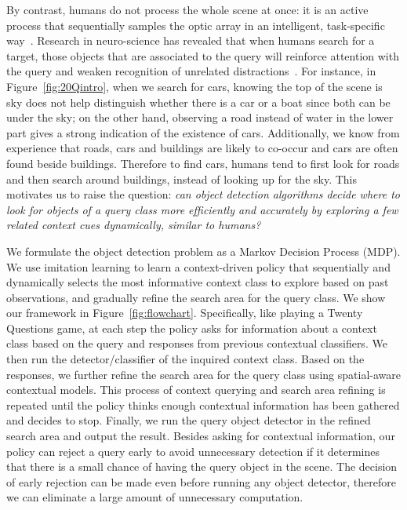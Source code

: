 By contrast, humans do not process the whole scene at once: it is an active process that sequentially samples the optic array in an intelligent, task-specific way~\cite{najemnik2005optimal}. Research in neuro-science has revealed that when humans search for a target, those objects that are associated to the query will reinforce attention with the query and weaken recognition of unrelated distractions~\cite{moores2003associative}. 
For instance, in Figure~\ref{fig:20Qintro}, when we search for cars, knowing the top of the scene is sky does not help distinguish whether there is a car or a boat since both can be under the sky; 
on the other hand, observing a road instead of water in the lower part gives a strong indication of the existence of cars. 
Additionally, we know from experience that roads, cars and buildings are likely to co-occur and cars are often found beside buildings. 
Therefore to find cars, humans tend to first look for roads and then search around buildings, instead of looking up for the sky. %
This motivates us to raise the question: \textit{can object detection algorithms decide where to look for objects of a query class more efficiently and accurately by exploring a few related context cues dynamically, similar to humans?}

We formulate the object detection problem as a Markov Decision Process (MDP). 
We use imitation learning to learn a context-driven policy that sequentially and dynamically selects the most informative context class to explore based on past observations, and gradually refine the search area for the query class. 
We show our framework in Figure~\ref{fig:flowchart}.  Specifically, like playing a Twenty Questions game, at each step the policy asks for information about a context class based on the query and responses from previous contextual classifiers. 
We then run the detector/classifier of the inquired context class. Based on the responses, we further refine the search area for the query class using spatial-aware contextual models. 
This process of context querying and search area refining is repeated until the policy thinks enough contextual information has been gathered and decides to stop. 
Finally, we run the query object detector in the refined search area and output the result. 
Besides asking for contextual information, our policy can reject a query early to avoid unnecessary detection if it determines that there is a small chance of having the query object in the scene. 
The decision of early rejection can be made even before running any object detector, therefore we can eliminate a large amount of unnecessary computation. 

